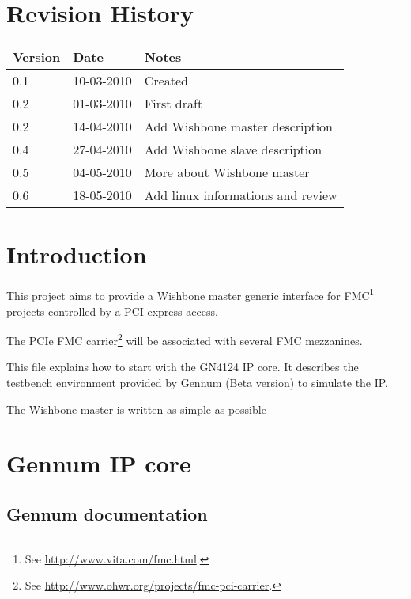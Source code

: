 \documentclass[10pt,a4paper]{cerndoc}
\begin{document}
\cerntitle
\section*{Revision History}
\begin{tabularx}{\textwidth}{|p{3cm}|p{3cm}|X|}
\hline \textbf{Version}&\textbf{Date}&\textbf{Notes}\\ \hline \hline
0.1 & 10-03-2010 & Created\\ \hline
0.2 & 01-03-2010 & First draft\\ \hline
0.2 & 14-04-2010 & Add Wishbone master description \\ \hline
0.4 & 27-04-2010 & Add Wishbone slave description\\ \hline
0.5 & 04-05-2010 & More about Wishbone master\\ \hline
0.6 & 18-05-2010 & Add linux informations and review\\ \hline
\end{tabularx}

\tableofcontents
\listoffigures
\clearpage

\section*{Introduction}
This project aims to provide a Wishbone master generic interface for FMC\footnote{See \href{http://www.vita.com/fmc.html}{http://www.vita.com/fmc.html}.} projects controlled by a PCI express access.

The PCIe FMC carrier\footnote{See \href{http://www.ohwr.org/projects/fmc-pci-carrier}{http://www.ohwr.org/projects/fmc-pci-carrier}.} will be associated with several FMC mezzanines.

This file explains how to start with the GN4124 IP core. It describes the testbench environment provided by Gennum (Beta version) to simulate the IP. 

The Wishbone master is written as simple as possible

\section{Gennum IP core}
\subsection{Gennum documentation}
\end{document}
